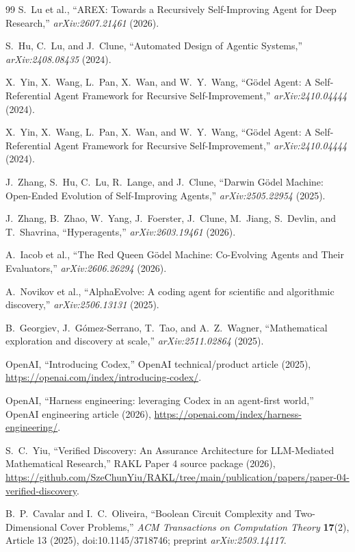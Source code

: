 \begin{thebibliography}{99}
S.~Lu et al.,
``AREX: Towards a Recursively Self-Improving Agent for Deep Research,''
\emph{arXiv:2607.21461} (2026).

S.~Hu, C.~Lu, and J.~Clune,
``Automated Design of Agentic Systems,''
\emph{arXiv:2408.08435} (2024).

X.~Yin, X.~Wang, L.~Pan, X.~Wan, and W.~Y.~Wang,
``G\"odel Agent: A Self-Referential Agent Framework for Recursive Self-Improvement,''
\emph{arXiv:2410.04444} (2024).

X.~Yin, X.~Wang, L.~Pan, X.~Wan, and W.~Y.~Wang,
``G\"odel Agent: A Self-Referential Agent Framework for Recursive Self-Improvement,''
\emph{arXiv:2410.04444} (2024).

J.~Zhang, S.~Hu, C.~Lu, R.~Lange, and J.~Clune,
``Darwin G\"odel Machine: Open-Ended Evolution of Self-Improving Agents,''
\emph{arXiv:2505.22954} (2025).

J.~Zhang, B.~Zhao, W.~Yang, J.~Foerster, J.~Clune, M.~Jiang, S.~Devlin, and T.~Shavrina,
``Hyperagents,''
\emph{arXiv:2603.19461} (2026).

A.~Iacob et al.,
``The Red Queen G\"odel Machine: Co-Evolving Agents and Their Evaluators,''
\emph{arXiv:2606.26294} (2026).

A.~Novikov et al.,
``AlphaEvolve: A coding agent for scientific and algorithmic discovery,''
\emph{arXiv:2506.13131} (2025).

B.~Georgiev, J.~G\'omez-Serrano, T.~Tao, and A.~Z.~Wagner,
``Mathematical exploration and discovery at scale,''
\emph{arXiv:2511.02864} (2025).

OpenAI,
``Introducing Codex,''
OpenAI technical/product article (2025),
\url{https://openai.com/index/introducing-codex/}.

OpenAI,
``Harness engineering: leveraging Codex in an agent-first world,''
OpenAI engineering article (2026),
\url{https://openai.com/index/harness-engineering/}.

S.~C.~Yiu,
``Verified Discovery: An Assurance Architecture for LLM-Mediated Mathematical Research,''
RAKL Paper 4 source package (2026),
\url{https://github.com/SzeChunYiu/RAKL/tree/main/publication/papers/paper-04-verified-discovery}.

B.~P.~Cavalar and I.~C.~Oliveira,
``Boolean Circuit Complexity and Two-Dimensional Cover Problems,''
\emph{ACM Transactions on Computation Theory} \textbf{17}(2), Article 13 (2025),
doi:10.1145/3718746; preprint \emph{arXiv:2503.14117}.


\end{thebibliography}
